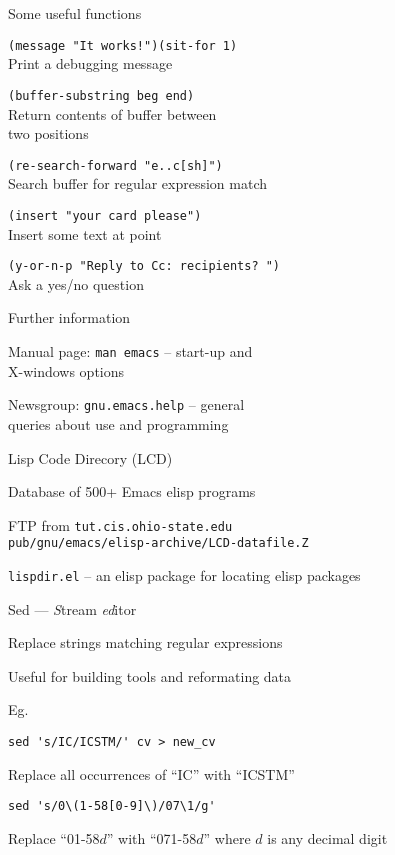 \begin{slide}{}
Some useful functions

{\tt (message "It works!")(sit-for 1)} \\
Print a debugging message

{\tt (buffer-substring beg end)} \\
Return contents of buffer between \\
two positions

{\tt (re-search-forward "e..c[sh]")} \\
Search buffer for regular expression match

{\tt (insert "your card please")} \\
Insert some text at point

{\tt (y-or-n-p "Reply to Cc:\ recipients?\ ")} \\
Ask a yes/no question
\end{slide}

\begin{slide}{}
Further information

Manual page: {\tt man emacs} -- start-up and \\
X-windows options

Newsgroup: {\tt gnu.emacs.help} -- general \\
queries about use and programming

Lisp Code Direcory (LCD)

Database of 500+ Emacs elisp programs

FTP from {\tt tut.cis.ohio-state.edu} \\
{\tt pub/gnu/emacs/elisp-archive/LCD-datafile.Z}

{\tt lispdir.el} -- an elisp package for locating elisp packages
\end{slide}

\begin{slide}{}
Sed --- {\em S}\/tream {\em ed}\/itor

Replace strings matching regular expressions

Useful for building tools and reformating data

Eg.
\begin{verbatim}
sed 's/IC/ICSTM/' cv > new_cv
\end{verbatim}

Replace all occurrences of ``IC'' with ``ICSTM''

\begin{verbatim}
sed 's/0\(1-58[0-9]\)/07\1/g'
\end{verbatim}

Replace ``01-58$d$'' with ``071-58$d$'' where $d$ is any decimal
digit
\end{slide}

